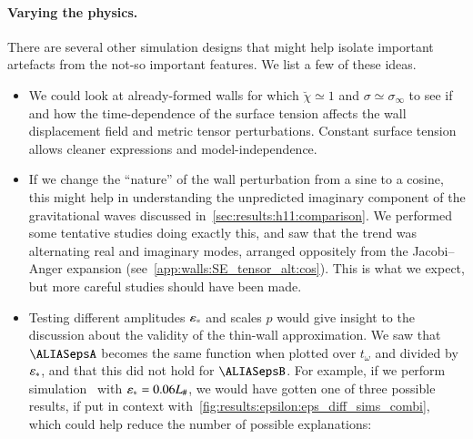 \paragraph{Varying the physics.} %
There are several other simulation designs that might help isolate important artefacts from the not-so important features. We list a few of these ideas.
\begin{itemize}
    \item We could look at already-formed walls for which $\breve{\chi}\simeq 1$ and  $\sigma \simeq \sigma_\infty$ to see if and how the time-dependence of the surface tension affects the wall displacement field and metric tensor perturbations. Constant surface tension allows cleaner expressions and model-independence. 
    \item If we change the ``nature'' of the wall perturbation from a sine to a cosine, this might help in understanding the unpredicted imaginary component of the gravitational waves discussed in~\cref{sec:results:h11:comparison}. We performed some tentative studies doing exactly this, and saw that the trend was alternating real and imaginary modes, arranged oppositely from the Jacobi--Anger expansion (see~\cref{app:walls:SE_tensor_alt:cos}). This is what we expect, but more careful studies should have been made.
    \item Testing different amplitudes $\varepsilon_\ast$ and scales $p$ would give insight to the discussion about the validity of the thin-wall approximation. We saw that $\epsA$ becomes the same function when plotted over $t_\omega$ and divided by $\varepsilon_\ast$, and that this did not hold for $\epsB$. For example, if we perform simulation~ with $\varepsilon_\ast=0.06L_\#$, we would have gotten one of three possible results, if put in context with~\cref{fig:results:epsilon:eps_diff_sims_combi}, which could help reduce the number of possible explanations: %

\end{itemize}
